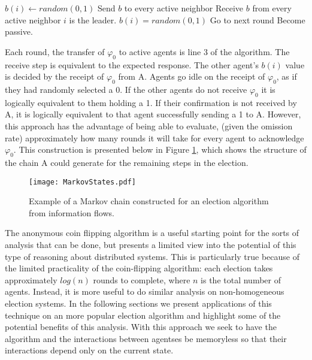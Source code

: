 \begin{algorithmic}[1]
\small
\State $b(i) \gets random(0,1)$
\State Send $b$ to every active neighbor
\State Receive $b$ from every active neighbor
	\State $i$ is the leader.
	\State $b(i) = random(0,1)$
	\State Go to next round
	\State Become passive.
\EndIf
\end{algorithmic}

Each round, the transfer of $\varphi_0$ to active agents is line 3 of the algorithm. The receive step is equivalent to the expected response. The other agent's $b(i)$ value is decided by the receipt of $\varphi_0$ from A. Agents go idle on the receipt of $\varphi_0$, as if they had randomly selected a 0. If the other agents do not receive $\varphi_0$ it is logically equivalent to them holding a 1. If their confirmation is not received by A, it is logically equivalent to that agent successfully sending a 1 to A. However, this approach has the advantage of being able to evaluate, (given the omission rate) approximately how many rounds it will take for every agent to acknowledge $\varphi_0$. This construction is presented below in Figure \ref{fig:markovstates}, which shows the structure of the chain A could generate for the remaining steps in the election.

\begin{figure}
\begin{centering}
\texttt{[image: MarkovStates.pdf]}
\caption{Example of a Markov chain constructed for an election algorithm from information flows.}
\label{fig:markovstates}
\end{centering}
\end{figure}


The anonymous coin flipping algorithm is a useful starting point for the sorts of analysis that can be done, but presents a limited view into the potential of this type of reasoning about distributed systems. This is particularly true because of the limited practicality of the coin-flipping algorithm: each election takes approximately $log(n)$ rounds to complete, where $n$ is the total number of agents. Instead, it is more useful to do similar analysis on non-homogeneous election systems. In the following sections we present applications of this technique on an more popular election algorithm and highlight some of the potential benefits of this analysis.
With this approach we seek to have the algorithm and the interactions between agentses be memoryless so that their interactions depend only on the current state. 

